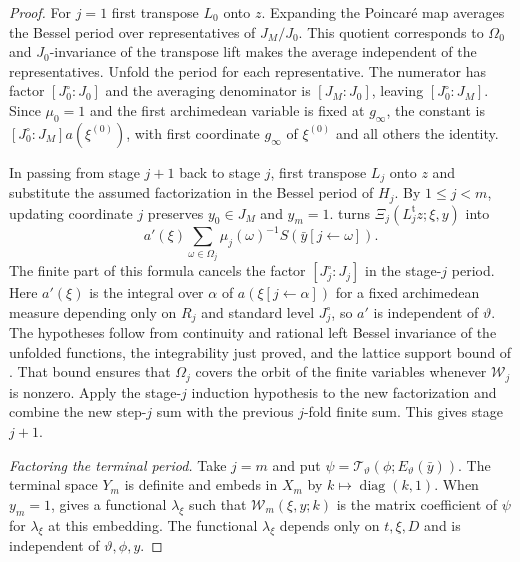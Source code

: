 \begin{proof}
For $j=1$ first transpose $L_0$ onto $z$. Expanding the Poincaré map averages the Bessel period over representatives of $J_M/J_0$. This quotient corresponds to $\Omega_0$ and $J_0$-invariance of the transpose lift makes the average independent of the representatives. Unfold the period for each representative. The numerator has factor $[J_0^\circ:J_0]$ and the averaging denominator is $[J_M:J_0]$, leaving $[J_0^\circ:J_M]$. Since $\mu_0=1$ and the first archimedean variable is fixed at $g_\infty$, the constant is $[J_0^\circ:J_M]a(\xi^{(0)})$, with first coordinate $g_\infty$ of $\xi^{(0)}$ and all others the identity.

In passing from stage $j+1$ back to stage $j$, first transpose $L_j$ onto $z$ and substitute the assumed factorization in the Bessel period of $H_j$. By $1\le j<m$, updating coordinate $j$ preserves $y_0\in J_M$ and $y_m=1$.  turns $\Xi_j(L_j^{\mathrm t}z;\xi,y)$ into
\[
 a'(\xi)\sum_{\omega\in\Omega_j}
    \mu_j(\omega)^{-1} S(\bar y[j\leftarrow\omega]).
\]
The finite part of this formula cancels the factor $[J_j^\circ:J_j]$ in the stage-$j$ period. Here $a'(\xi)$ is the integral over $\alpha$ of $a(\xi[j\leftarrow\alpha])$ for a fixed archimedean measure depending only on $R_j$ and standard level $J_j^\circ$, so $a'$ is independent of $\vartheta$. The hypotheses follow from continuity and rational left Bessel invariance of the unfolded functions, the integrability just proved, and the lattice support bound of . That bound ensures that $\Omega_j$ covers the orbit of the finite variables whenever $\mathcal W_j$ is nonzero. Apply the stage-$j$ induction hypothesis to the new factorization and combine the new step-$j$ sum with the previous $j$-fold finite sum. This gives stage $j+1$.

\emph{Factoring the terminal period.}
Take $j=m$ and put $\psi=\mathcal T_\vartheta(\phi;E_\vartheta(\bar y))$. The terminal space $Y_m$ is definite and embeds in $X_m$ by $k\mapsto\operatorname{diag}(k,1)$. When $y_m=1$,  gives a functional $\lambda_\xi$ such that $\mathcal W_m(\xi,y;k)$ is the matrix coefficient of $\psi$ for $\lambda_\xi$ at this embedding. The functional $\lambda_\xi$ depends only on $t,\xi,D$ and is independent of $\vartheta,\phi,y$.


\end{proof}
